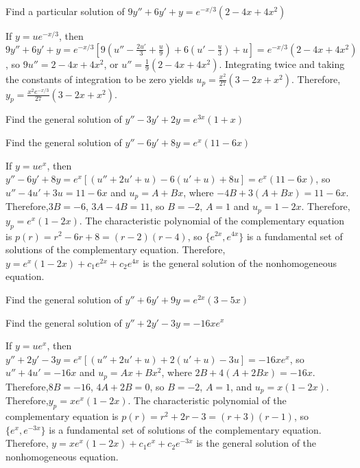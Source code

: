\documentclass{ximera}
\begin{document}
\begin{problem}\label{exer:5.4.14} Find a particular
solution of $9y''+6y'+y=e^{-x/3}(2-4x+4x^2)$
\begin{solution}
If $y=ue^{-x/3}$, then
$9y''+6y'+y=e^{-x/3}\left[9\left(u''-\frac{2u'}{3}+\frac{u}{9}\right)
+6\left(u'-\frac{u}{3}\right)+u\right]= e^{-x/3}(2-4x+4x^2)$, so
$9u''=2-4x+4x^2$, or $u''=\frac{1}{9}(2-4x+4x^2)$. Integrating twice
and taking the constants of integration to be zero yields
$u_p=\frac{x^2}{27}(3-2x+x^2)$. Therefore,
$y_p=\frac{x^2e^{-x/3}}{27}(3-2x+x^2)$.
\end{solution}
\end{problem}

\begin{problem}\label{exer:5.4.15} Find the general
solution of $y''-3y'+2y=e^{3x}(1+x)$ 
\end{problem}

\begin{problem}\label{exer:5.4.16} Find the general
solution of $y''-6y'+8y=e^x(11-6x)$
\begin{solution}
If $y=ue^x$, then $y''-6y'+8y=e^x\left[(u''+2u'+u)-6(u'+u)+8u\right]=
e^x(11-6x)$, so $u''-4u'+3u =11-6x$ and $u_p=A+Bx$, where
$-4B+3(A+Bx)=11-6x$. Therefore,$3B=-6$, $3A-4B=11$, so $B=-2$, $A=1$
and $u_p=1-2x$. Therefore,$y_p=e^x(1-2x)$. The characteristic
polynomial of the complementary equation is
$p(r)=r^2-6r+8=(r-2)(r-4)$, so $\{e^{2x},e^{4x}\}$ is a fundamental
set of solutions of the complementary equation. Therefore,
$y=e^x(1-2x)+c_1e^{2x}+c_2e^{4x}$ is the general solution of the
nonhomogeneous equation.
\end{solution}
\end{problem}

\begin{problem}\label{exer:5.4.17} Find the general
solution of $ y''+6y'+9y=e^{2x}(3-5x)$ 
\end{problem}

\begin{problem}\label{exer:5.4.18} Find the general
solution of $y''+2y'-3y=-16xe^x$
\begin{solution}
If $y=ue^x$, then $y''+2y'-3y=e^x\left[(u''+2u'+u)+2(u'+u)-3u\right]=
-16xe^x$, so $u''+4u'=-16x$ and $u_p=Ax+Bx^2$, where
$2B+4(A+2Bx)=-16x$. Therefore,$8B=-16$, $4A+2B=0$, so $B=-2$, $A=1$,
and $u_p=x(1-2x)$. Therefore,$y_p=xe^x(1-2x)$. The characteristic
polynomial of the complementary equation is
$p(r)=r^2+2r-3=(r+3)(r-1)$, so $\{e^x,e^{-3x}\}$ is a fundamental set
of solutions of the complementary equation. Therefore,
$y=xe^x(1-2x)+c_1e^x+c_2e^{-3x}$ is the general solution of the
nonhomogeneous equation.
\end{solution}
\end{problem}
\end{document}
